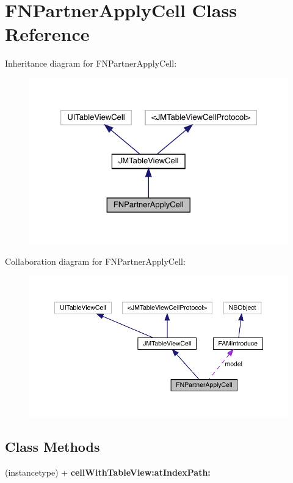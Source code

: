 \hypertarget{interface_f_n_partner_apply_cell}{}\section{F\+N\+Partner\+Apply\+Cell Class Reference}
\label{interface_f_n_partner_apply_cell}


Inheritance diagram for F\+N\+Partner\+Apply\+Cell\+:\nopagebreak
\begin{figure}[H]
\begin{center}
\leavevmode
\includegraphics[width=326pt]{interface_f_n_partner_apply_cell__inherit__graph}
\end{center}
\end{figure}


Collaboration diagram for F\+N\+Partner\+Apply\+Cell\+:\nopagebreak
\begin{figure}[H]
\begin{center}
\leavevmode
\includegraphics[width=350pt]{interface_f_n_partner_apply_cell__coll__graph}
\end{center}
\end{figure}
\subsection*{Class Methods}
\begin{DoxyCompactItemize}
\item 
\mbox{\label{interface_f_n_partner_apply_cell_a5084c803f3d4a58128c658dddba4795b}} 
(instancetype) + {\bfseries cell\+With\+Table\+View\+:at\+Index\+Path\+:}
\end{DoxyCompactItemize}
